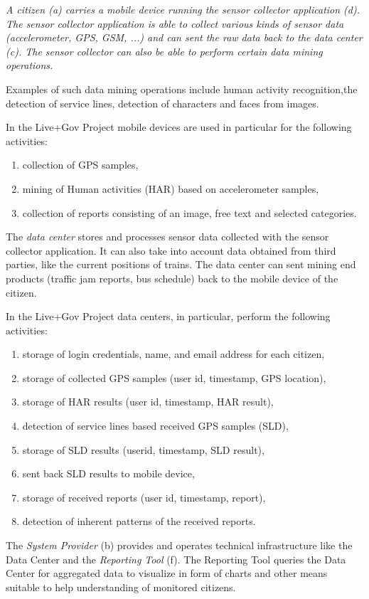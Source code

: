 \documentclass[runningheads,a4paper]{llncs}
\newenvironment{LGContent}
{ \par\color{blue} \it \small }
{ \par }
\begin{document}
\begin{LGContent}
A \emph{citizen} (a) carries a mobile device running the \emph{sensor collector} application (d).
The sensor collector application is able to collect various kinds of sensor data (accelerometer, GPS, GSM, ...) and can sent the raw data back to the \emph{data center} (c).
The sensor collector can also be able to perform certain data mining operations.

Examples of such data mining operations include human activity recognition,the detection of service lines, detection of characters and faces from images.

In the Live+Gov Project mobile devices are used in particular for the following activities:
\begin{enumerate}
\item collection of GPS samples,
\item mining of Human activities (HAR) based on accelerometer samples,
\item collection of reports consisting of an image, free text and selected categories.
\end{enumerate}

The \emph{data center} stores and processes sensor data collected with the sensor collector application. It can also take into account data obtained from third parties, like the current positions of trains.
The data center can sent mining end products (traffic jam reports, bus schedule) back to the mobile device of the citizen.

In the Live+Gov Project data centers, in particular, perform the following activities:
\begin{enumerate}
\item storage of login credentials, name, and email address for each citizen,
\item storage of collected GPS samples (user id, timestamp, GPS location),
\item storage of HAR results (user id, timestamp, HAR result),
\item detection of service lines based received GPS samples (SLD),
\item storage of SLD results (userid, timestamp, SLD result),
\item sent back SLD results to mobile device,
\item storage of received reports (user id, timestamp, report),
\item detection of inherent patterns of the received reports.
\end{enumerate}

The \emph{System Provider} (b) provides and operates technical infrastructure like the Data Center and the \emph{Reporting Tool} (f).
The Reporting Tool queries the Data Center for aggregated data to visualize in form of charts and other means suitable to help understanding of monitored citizens.


\end{LGContent}
\end{document}
